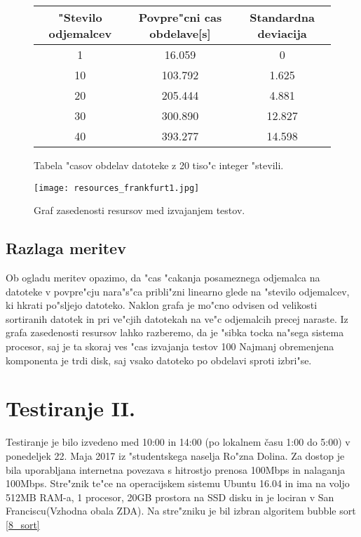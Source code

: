 \begin{figure}[!htbp]
  \centering
  \begin{tabular}{ | c | c | c | }
    \hline
    "Stevilo odjemalcev & Povpre"cni cas obdelave[s] & Standardna deviacija\\ \hline
    1 & 16.059     & 0 \\ \hline
    10 & 103.792 & 1.625\\ \hline
    20 & 205.444 & 4.881\\ \hline
    30 & 300.890 & 12.827\\ \hline
    40 & 393.277 & 14.598\\ \hline
  \end{tabular}
  \caption{Tabela "casov obdelav datoteke z 20 tiso"c integer "stevili.}
  \label{8_table1}
  \centering
\end{figure}



\begin{figure}
  \centering
    \texttt{[image: resources\_frankfurt1.jpg]}
  \caption{Graf zasedenosti resursov med izvajanjem testov.}
  \label{8_test1_res}
\end{figure}

\subsection{Razlaga meritev}
Ob ogladu meritev opazimo, da "cas "cakanja posameznega odjemalca na datoteke v povpre"cju nara"s"ca pribli"zni linearno glede na "stevilo odjemalcev, ki hkrati po"sljejo datoteko.
Naklon grafa je mo"cno odvisen od velikosti sortiranih datotek in pri ve"cjih datotekah na ve"c odjemalcih precej naraste.
Iz grafa zasedenosti resursov lahko razberemo, da je "sibka tocka na"sega sistema procesor, saj je ta skoraj ves "cas izvajanja testov 100%
Najmanj obremenjena komponenta je trdi disk, saj vsako datoteko po obdelavi sproti izbri"se.

\section{Testiranje II. }
Testiranje je bilo izvedeno med 10:00 in 14:00 (po lokalnem času 1:00 do 5:00)  v ponedeljek 22. Maja 2017 iz "studentskega naselja Ro"zna Dolina. Za dostop je bila uporabljana internetna povezava s hitrostjo prenosa 100Mbps in nalaganja 100Mbps.
Stre"znik te"ce na operacijskem sistemu Ubuntu 16.04 in ima na voljo 512MB RAM-a, 1 procesor, 20GB prostora na SSD disku in je lociran v San Franciscu(Vzhodna obala ZDA). Na stre"zniku je bil izbran algoritem bubble sort \ref{8_sort}


